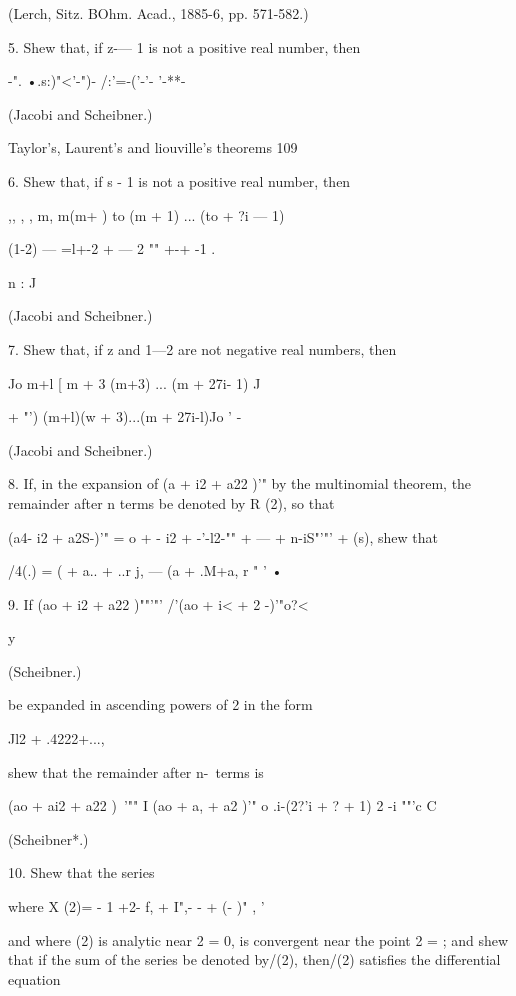 {{{{(Lerch, Sitz. BOhm. Acad., 1885-6, pp. 571-582.) 

5. Shew that, if z-— 1 is not a positive real number, then 

-".  •.s:)"<'-")- /:'=-('-'- '-**- 

(Jacobi and Scheibner.) 



Taylor's, Laurent's and liouville's theorems 109 

6. Shew that, if s - 1 is not a positive real number, then 

,, , , m, m(m+ )    to (m + 1) ... (to + ?i — 1) 

(1-2) — =l+-2 + —  2 "" +-+  -1 .   

n : J 

(Jacobi and Scheibner.) 

7. Shew that, if z and 1—2 are not negative real numbers, then 

  Jo m+l [ m + 3 (m+3) ... (m + 27i- 1) J 

+  "') (m+l)(w + 3)...(m + 27i-l)Jo    ' - 

(Jacobi and Scheibner.) 

8. If, in the expansion of (a +  i2 + a22 )'" by the multinomial theorem, the remainder 
after n terms be denoted by R  (2), so that 

(a4- i2 + a2S-)'" =  o + - i2 + -'-l2-"" + --- +  n-iS"'"' +   (s), 
shew that 



/4(.) = (  + a.. +  ..r j, —   (a + .M+a, r "   ' • 

9. If (ao +  i2 + a22 )""'"' /'(ao +  i< +  2 -)'"o?< 

y 



(Scheibner.) 



be expanded in ascending powers of 2 in the form 

Jl2 + .4222+..., 

shew that the remainder after n-\ terms is 

(ao + ai2 + a22 )~'""  I (ao + a,  + a2 )'"   o .i-(2?'i + ?  + 1)  2  -i    ""'c C 

(Scheibner*.) 

10. Shew that the series 

where X (2)= - 1 +2- f, + I",- - + (- )" , ' 

and where (2) is analytic near 2 = 0, is convergent near the point 2 = ; and shew that if 
the sum of the series be denoted by/(2), then/(2) satisfies the differential equation 

}}}}
